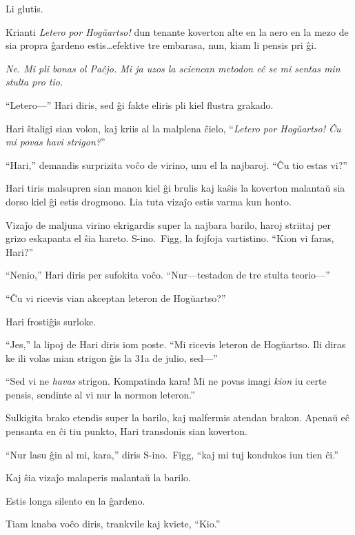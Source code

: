 Li glutis.

Krianti \emph{Letero por Hogŭartso!} dun tenante koverton alte en la aero en la mezo de sia propra ĝardeno estis…efektive tre embarasa, nun, kiam li pensis pri ĝi.

\emph{Ne.
Mi pli bonas ol Paĉjo.
Mi ja uzos la sciencan metodon eĉ se mi sentas min stulta pro tio.}

“Letero—” Hari diris, sed ĝi fakte eliris pli kiel flustra grakado.

Hari ŝtaligi sian volon, kaj kriis al la malplena ĉielo, “\emph{Letero por Hogŭartso!
Ĉu mi povas havi strigon?}”

“Hari,” demandis surprizita voĉo de virino, unu el la najbaroj.
“Ĉu tio estas vi?”

Hari tiris malsupren sian manon kiel ĝi brulis kaj kaŝis la koverton malantaŭ sia dorso kiel ĝi estis drogmono.
Lia tuta vizaĵo estis varma kun honto.

Vizaĵo de maljuna virino ekrigardis super la najbara barilo, haroj striitaj per grizo eskapanta el ŝia hareto.
S\nobreakdash-ino.~Figg, la fojfoja vartistino.
“Kion vi faras, Hari?”

“Nenio,” Hari diris per sufokita voĉo.
“Nur—testadon de tre stulta teorio—”

“Ĉu vi ricevis vian akceptan leteron de Hogŭartso?”

Hari frostiĝis surloke.

“Jes,” la lipoj de Hari diris iom poste.
“Mi ricevis leteron de Hogŭartso.
Ili diras ke ili volas mian strigon ĝis la 31a de julio, sed—”

“Sed vi ne \emph{havas} strigon.
Kompatinda kara!
Mi ne povas imagi \emph{kion} iu certe pensis, sendinte al vi nur la normon leteron.”

Sulkigita brako etendis super la barilo, kaj malfermis atendan brakon.
Apenaŭ eĉ pensanta en ĉi tiu punkto, Hari transdonis sian koverton.

“Nur lasu ĝin al mi, kara,” diris S\nobreakdash-ino.~Figg, “kaj mi tuj kondukos iun tien ĉi.”

Kaj ŝia vizaĵo malaperis malantaŭ la barilo.

Estis longa silento en la ĝardeno.

Tiam knaba voĉo diris, trankvile kaj kviete, “Kio.”

